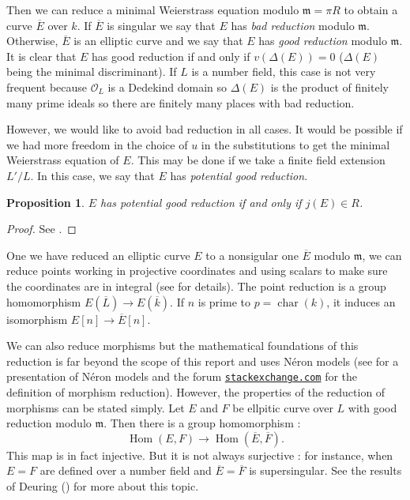 \documentclass[a4paper,10pt,notitlepage]{report}
\theoremstyle{definition}
\theoremstyle{plain}
\newtheorem{Proposition}[Definition]{Proposition}
\theoremstyle{definition}
\newcommand{\mO}{\mathcal{O}}
\renewcommand{\(}{\left(}
\renewcommand{\)}{\right)}
\newcommand{\mfm}{\mathfrak{m}}
\DeclareMathOperator{\Hom}{Hom}
\DeclareMathOperator{\Char}{char}%
\begin{document}
Then we can reduce a minimal Weierstrass equation modulo $\mfm=\pi R$ to obtain a curve $\overline{E}$ over $k$.  If $\overline{E}$ is singular we say that $E$ has \emph{bad reduction} modulo $\mfm$.  Otherwise,  $\overline{E}$ is an elliptic curve and we say that $E$ has \emph{good reduction} modulo $\mfm$.  It is clear that $E$ has good reduction if and only if $v(\Delta(E))=0$ ($\Delta(E)$ being the minimal discriminant).  If $L$ is a number field,  this case is not very frequent because $\mO_L$ is a Dedekind domain so $\Delta(E)$ is the product of finitely many prime ideals so there are finitely many places with bad reduction.

However,  we would like to avoid bad reduction in all cases.  It would be possible if we had more freedom in the choice of $u$ in the substitutions to get the minimal Weierstrass equation of $E$.  This may be done if we take a finite field extension $L'/L$.  In this case, we say that $E$ has \emph{potential good reduction}.

\begin{Proposition}\label{Proposition 1}
$E$ has potential good reduction if and only if $j(E)\in R$. 
\end{Proposition}

\begin{proof}
See \cite[Proposition VII.5.5]{Silverman1}.
\end{proof}

One we have reduced an elliptic curve $E$ to a nonsigular one $\overline{E}$ modulo $\mfm$,  we can reduce points working in projective coordinates and using scalars to make sure the coordinates are in integral (see \cite[VII.2 and VII.3]{Silverman1} for details).  The point reduction is a group homomorphism $E(\overline{L})\longrightarrow E(\overline{k})$.  If $n$ is prime to $p=\Char(k)$,  it induces an isomorphism $E[n]\longrightarrow \overline{E}[n]$.  

We can also reduce morphisms but the mathematical foundations of this reduction is far beyond the scope of this report and uses N\'{e}ron models (see \cite[chapter IV]{Silverman2} for a presentation of N\'{e}ron models and the forum \href{https://math.stackexchange.com/questions/2352060/definition-of-the-natural-reduction-map-tilde-phi-for-phie-1-to-e-2-an}{\protect\Verb+stackexchange.com+} for the definition of morphism reduction).  However,  the properties of the reduction of morphisms can be stated simply.  Let $E$ and $F$ be ellpitic curve over $L$ with good reduction modulo $\mfm$.  Then there is a group homomorphism :
\[\Hom(E,F)\longrightarrow\Hom(\overline{E},\overline{F}).\]
This map is in fact injective.  But it is not always surjective : for instance,  when $E=F$ are defined over a number field and $\overline{E}=\overline{F}$ is supersingular.  See the results of Deuring (\cite[chapter 13]{Lang_EF}) for more about this topic.   
\end{document}
